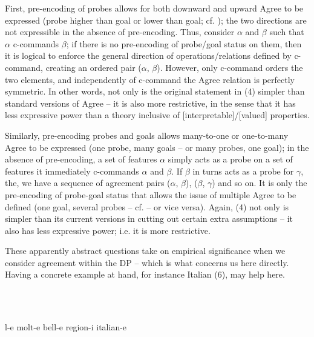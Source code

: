 \documentclass[output=paper]{langsci/langscibook}
\begin{document}
\begin{styleSfondomedioiColorexxi}
First, pre-encoding of probes allows for both downward and upward Agree to be expressed (probe higher than goal or lower than goal; cf. \citealt{Zeijlstra2012}); the two directions are not expressible in the absence of pre-encoding. Thus, consider $\alpha $ and $\beta $ such that $\alpha $ c-commands $\beta $; if there is no pre-encoding of probe/goal status on them, then it is logical to enforce the general direction of operations/relations defined by c-command, creating an ordered pair ($\alpha $, $\beta $). However, only c-command orders the two elements, and independently of c-command the Agree relation is perfectly symmetric. In other words, not only is the original statement in (4) simpler than standard versions of Agree – it is also more restrictive, in the sense that it has less expressive power than a theory inclusive of [interpretable]/[valued] properties.
\end{styleSfondomedioiColorexxi}

\begin{styleSfondomedioiColorexxi}
Similarly, pre-encoding probes and goals allows many-to-one or one-to-many Agree to be expressed (one probe, many goals – or many probes, one goal); in the absence of pre-encoding, a set of features $\alpha $ simply acts as a probe on a set of features it immediately c-commands $\alpha $ and $\beta $. If $\beta $ in turns acts as a probe for $\gamma $, the, we have a sequence of agreement pairs ($\alpha $, $\beta $), ($\beta $, $\gamma $) and so on. It is only the pre-encoding of probe-goal status that allows the issue of multiple Agree to be defined (one goal, several probes – cf. \citealt{Carstens2001} – or vice versa). Again, (4) not only is simpler than its current versions in cutting out certain extra assumptions – it also has less expressive power; i.e. it is more restrictive.
\end{styleSfondomedioiColorexxi}

\begin{styleSfondomedioiColorexxi}
These apparently abstract questions take on empirical significance when we consider agreement within the DP – which is what concerns us here directly. Having a concrete example at hand, for instance Italian (6), may help here. 
\end{styleSfondomedioiColorexxi}

\begin{styleSfondomedioiColorexxi}
\ea%
    \label{ex:key:6}
    \gll\\
        \\
    \glt
    \z

          l-e    molt-e   bell-e    region-i  italian-e
\end{styleSfondomedioiColorexxi}
\end{document}
